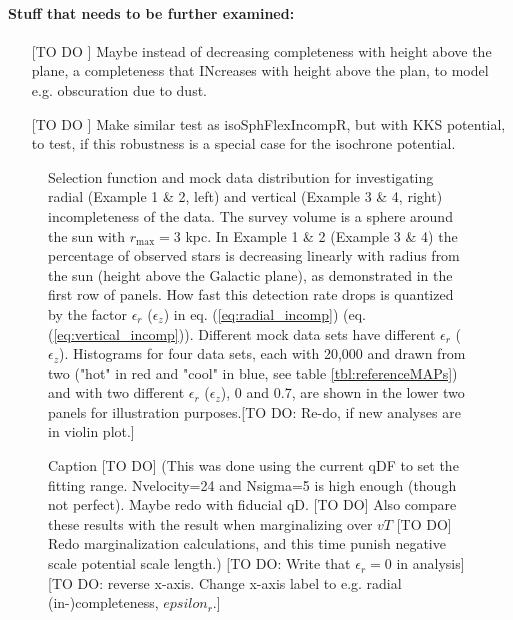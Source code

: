\paragraph{Stuff that needs to be further examined:}
\begin{itemize}
\item[[TO DO]] Maybe instead of decreasing completeness with height above the plane, a completeness that INcreases with height above the plan, to model e.g. obscuration due to dust.
\item[[TO DO]] Make similar test as isoSphFlexIncompR, but with KKS potential, to test, if this robustness is a special case for the isochrone potential.
\end{itemize}





\begin{figure}
\caption{Selection function and mock data distribution for investigating radial (Example 1 \& 2, left) and vertical (Example 3 \& 4, right) incompleteness of the data. The survey volume is a sphere around the sun with $r_\text{max} = 3$ kpc. In Example 1 \& 2 (Example 3 \& 4) the percentage of observed stars is decreasing linearly with radius from the sun (height above the Galactic plane), as demonstrated in the first row of panels. How fast this detection rate drops is quantized by the factor $\epsilon_r$ ($\epsilon_z$) in eq. (\ref{eq:radial_incomp}) (eq. (\ref{eq:vertical_incomp})). Different mock data sets have different $\epsilon_r$ ($\epsilon_z$). Histograms for four data sets, each with 20,000 and drawn from two \MAPs ("hot" in red and "cool" in blue, see table \ref{tbl:referenceMAPs}) and with two different $\epsilon_r$ ($\epsilon_z$), 0 and 0.7, are shown in the lower two panels for illustration purposes.[TO DO: Re-do, if new analyses are in violin plot.]} 
\label{fig:incomp_mockdata}
\end{figure}


\begin{figure}
\caption{Caption [TO DO] (This was done using the current qDF to set the fitting range. Nvelocity=24 and Nsigma=5 is high enough (though not perfect). Maybe redo with fiducial qD. [TO DO] Also compare these results with the result when marginalizing over $vT$ [TO DO] Redo marginalization calculations, and this time punish negative scale potential scale length.) [TO DO: Write that $\epsilon_r = 0$ in analysis] [TO DO: reverse x-axis. Change x-axis label to e.g. radial (in-)completeness, $epsilon_r$.]} 
\label{fig:isoSphFlexIncompR_violins}
\end{figure}

